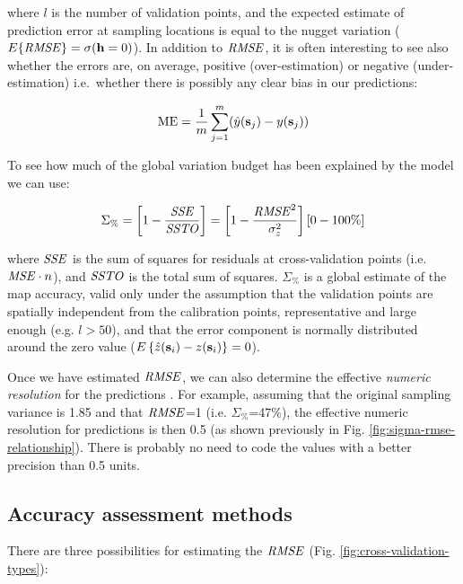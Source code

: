 \documentclass[11pt]{krantz}
\theoremstyle{definition}
\theoremstyle{definition}
\theoremstyle{definition}
\theoremstyle{remark}
\begin{document}
where \(l\) is the number of validation points, and the expected
estimate of prediction error at sampling locations is equal to the
nugget variation (\(E\{ {\it RMSE} \} = \sigma({\bf{h}}=0)\)). In
addition to \(\it{RMSE}\), it is often interesting to see also whether
the errors are, on average, positive (over-estimation) or negative
(under-estimation) i.e.~whether there is possibly any clear bias in our
predictions:

\begin{equation}
{\rm ME} = \frac{1}{m} \sum_{j=1}^{m} (\hat y ({\bf s}_j) - y ({\bf s}_j))
\label{eq:ME}
\end{equation}

To see how much of the global variation budget has been explained by the
model we can use:

\begin{equation}
 {\Sigma}_{\%} = \left[ 1 - \frac{{\it{SSE}}}{{\it{SSTO}}} \right] = \left[ 1 - \frac{{\it{RMSE}}^2}{\sigma_z^2} \right] [0-100\%]
\label{eq:normvar}
\end{equation}

where \(\it{SSE}\) is the sum of squares for residuals at
cross-validation points (i.e. \({\it{MSE}} \cdot n\)), and \(\it{SSTO}\)
is the total sum of squares. \({\Sigma}_{\%}\) is a global estimate of
the map accuracy, valid only under the assumption that the validation
points are spatially independent from the calibration points,
representative and large enough (e.g. \(l>50\)), and that the error
component is normally distributed around the zero value
(\(E\left\{ {\hat z({{\bf{s}}_i}) - z({{\bf{s}}_i})} \right\} = 0\)).

Once we have estimated \(\it{RMSE}\), we can also determine the
effective \emph{numeric resolution} for the predictions
\citep{Hengl2013JAG}. For example, assuming that the original sampling
variance is 1.85 and that \(\it{RMSE}\)=1 (i.e. \({\Sigma}_{\%}\)=47\%),
the effective numeric resolution for predictions is then 0.5 (as shown
previously in Fig. \ref{fig:sigma-rmse-relationship}). There is probably
no need to code the values with a better precision than 0.5 units.

\hypertarget{accuracy-assessment-methods}{%
\subsection{Accuracy assessment
methods}\label{accuracy-assessment-methods}}

There are three possibilities for estimating the \(\it{RMSE}\) (Fig.
\ref{fig:cross-validation-types}):
\end{document}
